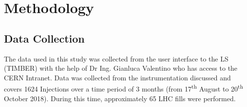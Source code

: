 \documentclass[conference, a4paper]{IEEEtran}
\begin{document}
	
	

	\section{Methodology}
	
	\subsection{Data Collection}
	\par The data used in this study was collected from the user interface to the LS (TIMBER) with the help of Dr Ing. Gianluca Valentino who has access to the CERN Intranet. Data was collected from the instrumentation discussed and covers 1624 Injections over a time period of 3 months (from 17\textsuperscript{th} August to 20\textsuperscript{th} October 2018). During this time, approximately 65 LHC fills were performed.
	
\end{document}
